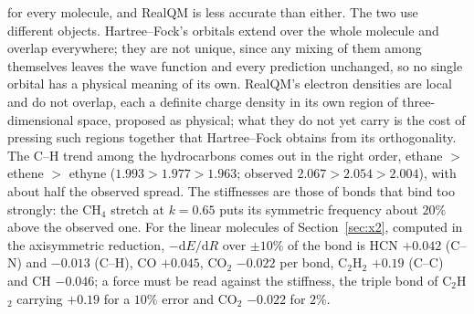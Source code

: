 \documentclass[11pt]{article}
\begin{document}
for every molecule, and RealQM is less accurate than either. The two use different objects. Hartree--Fock's orbitals extend over the whole molecule and overlap everywhere; they are not
unique, since any mixing of them among themselves leaves the wave function and every prediction unchanged, so
no single orbital has a physical meaning of its own. RealQM's electron densities are local and do not overlap,
each a definite charge density in its own region of three-dimensional space, proposed as physical; what they
do not yet carry is the cost of pressing such regions together that Hartree--Fock obtains from its
orthogonality. The C--H trend among the hydrocarbons
comes out in the right order, ethane $>$ ethene $>$ ethyne ($1.993 > 1.977 > 1.963$; observed $2.067 > 2.054 >
2.004$), with about half the observed spread. The stiffnesses are those of bonds that bind too strongly: the
CH$_4$ stretch at $k = 0.65$ puts its symmetric frequency about $20\%$ above the observed one. For the linear
molecules of Section~\ref{sec:x2}, computed in the axisymmetric reduction, $-\mathrm{d}E/\mathrm{d}R$ over $\pm10\%$ of
the bond is HCN $+0.042$ (C--N) and $-0.013$ (C--H), CO $+0.045$, CO$_2$ $-0.022$ per bond, C$_2$H$_2$ $+0.19$
(C--C) and CH $-0.046$; a force must be read against the stiffness, the triple bond of C$_2$H$_2$ carrying $+0.19$
for a $10\%$ error and CO$_2$ $-0.022$ for $2\%$.

\end{document}
